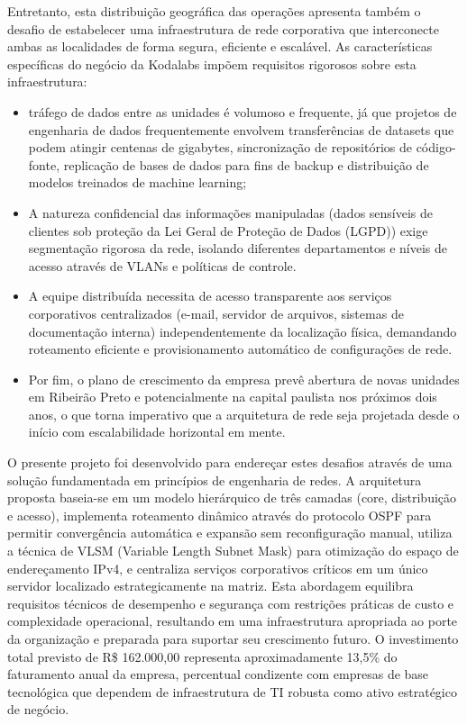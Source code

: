 \documentclass[12pt,a4paper]{article}
\begin{document}
Entretanto, esta distribuição geográfica das operações apresenta também o desafio de estabelecer uma infraestrutura de rede corporativa que interconecte ambas as localidades de forma segura, eficiente e escalável. As características específicas do negócio da Kodalabs impõem requisitos rigorosos sobre esta infraestrutura: 
\begin{itemize}
    \item  tráfego de dados entre as unidades é volumoso e frequente, já que projetos de engenharia de dados frequentemente envolvem transferências de datasets que podem atingir centenas de gigabytes, sincronização de repositórios de código-fonte, replicação de bases de dados para fins de backup e distribuição de modelos treinados de machine learning;
    \item A natureza confidencial das informações manipuladas (dados sensíveis de clientes sob proteção da Lei Geral de Proteção de Dados (LGPD))  exige segmentação rigorosa da rede, isolando diferentes departamentos e níveis de acesso através de VLANs e políticas de controle.
    \item A equipe distribuída necessita de acesso transparente aos serviços corporativos centralizados (e-mail, servidor de arquivos, sistemas de documentação interna) independentemente da localização física, demandando roteamento eficiente e provisionamento automático de configurações de rede.
    \item Por fim, o plano de crescimento da empresa prevê abertura de novas unidades em Ribeirão Preto e potencialmente na capital paulista nos próximos dois anos, o que torna imperativo que a arquitetura de rede seja projetada desde o início com escalabilidade horizontal em mente.
\end{itemize}

O presente projeto foi desenvolvido para endereçar estes desafios através de uma solução fundamentada em princípios de engenharia de redes. A arquitetura proposta baseia-se em um modelo hierárquico de três camadas (core, distribuição e acesso), implementa roteamento dinâmico através do protocolo OSPF para permitir convergência automática e expansão sem reconfiguração manual, utiliza a técnica de VLSM (Variable Length Subnet Mask) para otimização do espaço de endereçamento IPv4, e centraliza serviços corporativos críticos em um único servidor localizado estrategicamente na matriz. Esta abordagem equilibra requisitos técnicos de desempenho e segurança com restrições práticas de custo e complexidade operacional, resultando em uma infraestrutura apropriada ao porte da organização e preparada para suportar seu crescimento futuro. O investimento total previsto de R\$ 162.000,00 representa aproximadamente 13,5\% do faturamento anual da empresa, percentual condizente com empresas de base tecnológica que dependem de infraestrutura de TI robusta como ativo estratégico de negócio.
\end{document}
